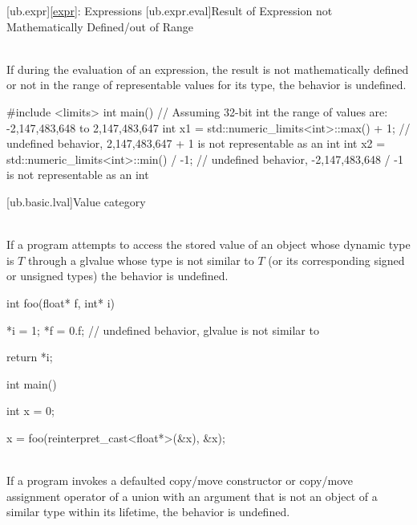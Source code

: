 {\pnum
\begin{example}
\begin{codeblock}
\end{codeblock}
\end{example}


[ub.expr]{\ref{expr}: Expressions}
[ub.expr.eval]{Result of Expression not Mathematically Defined/out of Range}

\pnum
{} \\
If during the evaluation of an expression, the result is not mathematically defined or not in the range of
representable values for its type, the behavior is undefined.

\pnum
\begin{example}
\begin{codeblock}
#include <limits>
int main() {
  // Assuming 32-bit int the range of values are: -2,147,483,648 to 2,147,483,647
  int x1 = std::numeric_limits<int>::max() + 1;     // undefined behavior, 2,147,483,647 + 1 is not representable as an int
  int x2 = std::numeric_limits<int>::min() / -1;    // undefined behavior, -2,147,483,648 / -1 is not representable as an int
}
\end{codeblock}
\end{example}

[ub.basic.lval]{Value category}

\pnum
{} \\
If a program attempts to access  the stored value of an object
whose dynamic type is $T$ through a glvalue whose type is not
similar  to $T$ (or its corresponding signed or unsigned types)
the behavior is undefined.

\pnum
\begin{example}
\begin{codeblock}
int foo(float* f, int* i) {
  *i = 1;
  *f = 0.f;     // undefined behavior, glvalue is not similar to 

  return *i;
}

int main() {
  int x = 0;

  x = foo(reinterpret_cast<float*>(&x), &x);
}
\end{codeblock}
\end{example}

\pnum
{} \\
If a program invokes a defaulted copy/move constructor or copy/move assignment
operator of a union with an argument that is not an object of a similar type
within its lifetime, the behavior is undefined.

}
